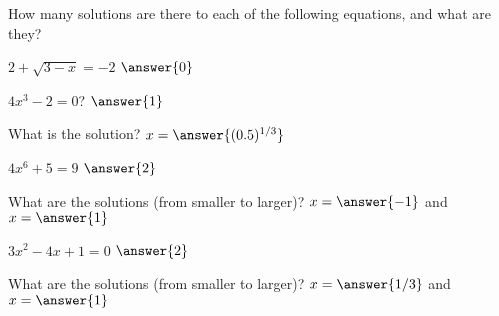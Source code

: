 \documentclass{ximera}
\author{Elizabeth Campolongo}
\begin{document}
\begin{exercise}
How many solutions are there to each of the following equations, and what are they?

\item $2+\sqrt{3-x}=-2$ $\answer{0}$
%
\item $4x^3-2=0$? $\answer{1}$
%
\begin{exercise}
What is the solution?
$x=\answer{(0.5)^{1/3}}$
\end{exercise}

\item $4x^6+5=9$ $\answer{2}$
\begin{exercise}
What are the solutions (from smaller to larger)?
$x=\answer{-1}$ and $x=\answer{1}$
\end{exercise}

\item $3x^2-4x+1=0$ $\answer{2}$
\begin{exercise}
What are the solutions (from smaller to larger)?
$x=\answer{1/3}$ and $x=\answer{1}$
\end{exercise}


\end{exercise}
\end{document}
